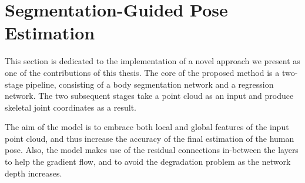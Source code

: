 \section{Segmentation-Guided Pose Estimation} %

This section is dedicated to the implementation of a novel approach we present as one of the contributions of this thesis. The core of the proposed method is a two-stage pipeline, consisting of a body segmentation network and a regression network. The two subsequent stages take a point cloud as an input and produce skeletal joint coordinates as a result.\par
\vspace{5mm}
\noindent The aim of the model is to embrace both local and global features of the input point cloud, and thus increase the accuracy of the final estimation of the human pose. Also, the model makes use of the residual connections in-between the layers to help the gradient flow, and to avoid the degradation problem as the network depth increases.


